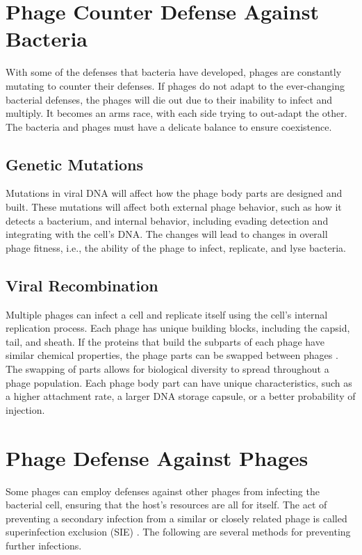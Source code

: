 \section{Phage Counter Defense Against Bacteria}
With some of the defenses that bacteria have developed, phages are constantly mutating to counter their defenses. 
If phages do not adapt to the ever-changing bacterial defenses, the phages will die out due to their inability to infect and multiply. 
It becomes an arms race, with each side trying to out-adapt the other. 
The bacteria and phages must have a delicate balance to ensure coexistence. 

\subsection{Genetic Mutations}
Mutations in viral DNA will affect how the phage body parts are designed and built. 
These mutations will affect both external phage behavior, such as how it detects a bacterium, and internal behavior, including evading detection and integrating with the cell’s DNA. 
The changes will lead to changes in overall phage fitness, i.e., the ability of the phage to infect, replicate, and lyse bacteria. 

\subsection{Viral Recombination}
Multiple phages can infect a cell and replicate itself using the cell’s internal replication process. 
Each phage has unique building blocks, including the capsid, tail, and sheath. 
If the proteins that build the subparts of each phage have similar chemical properties, the phage parts can be swapped between phages \cite{aksyukBacteriophageAssembly2011}. 
The swapping of parts allows for biological diversity to spread throughout a phage population. 
Each phage body part can have unique characteristics, such as a higher attachment rate, a larger DNA storage capsule, or a better probability of injection. 

\section{Phage Defense Against Phages}
Some phages can employ defenses against other phages from infecting the bacterial cell, ensuring that the host’s resources are all for itself. 
The act of preventing a secondary infection from a similar or closely related phage is called superinfection exclusion (SIE) \cite{patelAntiphageDefenceInhibition2024}. 
The following are several methods for preventing further infections. 

